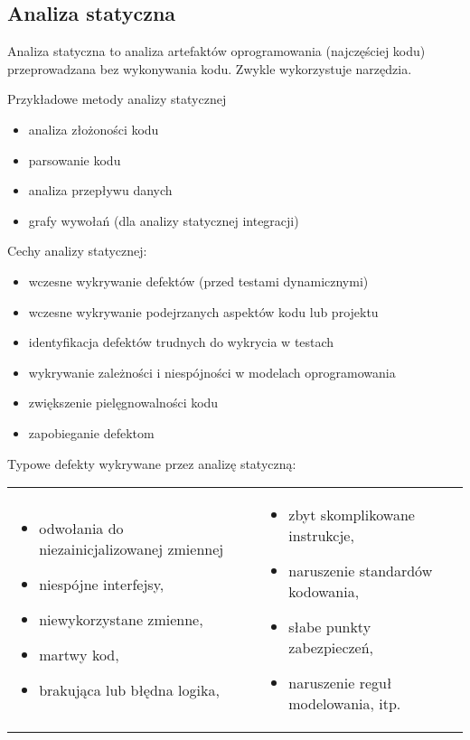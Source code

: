 \documentclass[../main.tex]{subfiles}
\begin{document}
    \subsection{Analiza statyczna}
    Analiza statyczna to analiza artefaktów oprogramowania (najczęściej kodu) przeprowadzana bez wykonywania kodu.
    Zwykle wykorzystuje narzędzia.

    Przykładowe metody analizy statycznej
    \begin{itemize}
        \item analiza złożoności kodu
        \item parsowanie kodu
        \item analiza przepływu danych
        \item grafy wywołań (dla analizy statycznej integracji)
    \end{itemize}

    Cechy analizy statycznej:
    \begin{itemize}
        \item wczesne wykrywanie defektów (przed testami dynamicznymi)
        \item wczesne wykrywanie podejrzanych aspektów kodu lub projektu
        \item identyfikacja defektów trudnych do wykrycia w testach
        \item wykrywanie zależności i niespójności w modelach oprogramowania
        \item zwiększenie pielęgnowalności kodu
        \item zapobieganie defektom
    \end{itemize}


    Typowe defekty wykrywane przez analizę statyczną:
    \begin{table}[H]
        \begin{center}
            \begin{tabular}{ p{8cm} p{8cm}}
                \begin{itemize}
                    \item odwołania do niezainicjalizowanej zmiennej
                    \item niespójne interfejsy,
                    \item niewykorzystane zmienne,
                    \item martwy kod,
                    \item brakująca lub błędna logika,
                \end{itemize} &
                \begin{itemize}
                    \item zbyt skomplikowane instrukcje,
                    \item naruszenie standardów kodowania,
                    \item słabe punkty zabezpieczeń,
                    \item naruszenie reguł modelowania, itp.
                \end{itemize}
            \end{tabular}
        \end{center}
    \end{table}
\end{document}
